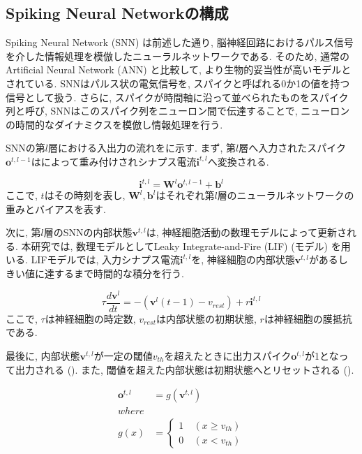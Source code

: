 \subsection{Spiking Neural Networkの構成}

Spiking Neural Network (SNN) は前述した通り, 脳神経回路におけるパルス信号を介した情報処理を模倣したニューラルネットワークである\cite{generalsnn}.
そのため, 通常のArtificial Neural Network (ANN) と比較して, より生物的妥当性が高いモデルとされている.
SNNはパルス状の電気信号を, スパイクと呼ばれる0か1の値を持つ信号として扱う.
さらに, スパイクが時間軸に沿って並べられたものをスパイク列と呼び, SNNはこのスパイク列をニューロン間で伝達することで, ニューロンの時間的なダイナミクスを模倣し情報処理を行う.

SNNの第$l$層における入出力の流れをに示す.
まず, 第$l$層へ入力されたスパイク$\bm{o}^{t, l-1}$はによって重み付けされシナプス電流$\bm{i}^{t,l}$へ変換される.

\begin{equation}
    \bm{i}^{t, l} = \bm{W}^l\bm{o}^{t, l-1} + \bm{b}^l
    \label{eq:input_spike}
\end{equation}
ここで, $t$はその時刻を表し, $\bm{W}^l, \bm{b}^l$はそれぞれ第$l$層のニューラルネットワークの重みとバイアスを表す.

次に, 第$l$層のSNNの内部状態$\bm{v}^{t, l}$は, 神経細胞活動の数理モデルによって更新される.
本研究では, 数理モデルとしてLeaky Integrate-and-Fire (LIF) (モデル) を用いる.
LIFモデルでは, 入力シナプス電流$\bm{i}^{t, l}$を, 神経細胞の内部状態$\bm{v}^{t, l}$があるしきい値に達するまで時間的な積分を行う.

\begin{equation}
    {\tau}\frac{d\bm{v}^l}{dt}=-\left(\bm{v}^l\left({t-1}\right)-v_{rest}\right)+r\bm{i}^{t, l}
    \label{eq:lif}
\end{equation}
ここで, $\tau$は神経細胞の時定数, $v_{rest}$は内部状態の初期状態, $r$は神経細胞の膜抵抗である.

最後に, 内部状態$\bm{v}^{t, l}$が一定の閾値$v_{th}$を超えたときに出力スパイク$\bm{o}^{t, l}$が1となって出力される ().
また, 閾値を超えた内部状態は初期状態へとリセットされる ().

\begin{equation}
    \begin{split}
      \bm{o}^{t, l}&=g\left(\bm{v}^{t, l}\right)\\
    where\\
    g\left(x\right)&=\left\{
      \begin{alignedat}{2}
        1 &\:\left(x{\geq}v_{th}\right)\\
        0 &\:\left(x{<}v_{th}\right)
      \end{alignedat}
    \right. 
    \end{split} \label{eq:outputSpike}
  \end{equation}

